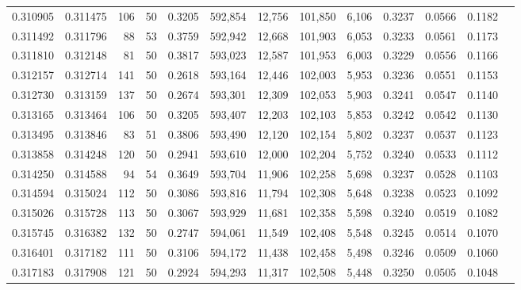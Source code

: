 \begin{tabular}{rrrrrrrrrrrrr}
0.310905 & 0.311475 &   106 &  50 &                                     0.3205 & 592,854 &  12,756 & 101,850 &   6,106 & 0.3237 & 0.0566 & 0.1182 \\
0.311492 & 0.311796 &    88 &  53 &                                     0.3759 & 592,942 &  12,668 & 101,903 &   6,053 & 0.3233 & 0.0561 & 0.1173 \\
0.311810 & 0.312148 &    81 &  50 &                                     0.3817 & 593,023 &  12,587 & 101,953 &   6,003 & 0.3229 & 0.0556 & 0.1166 \\
0.312157 & 0.312714 &   141 &  50 &                                     0.2618 & 593,164 &  12,446 & 102,003 &   5,953 & 0.3236 & 0.0551 & 0.1153 \\
0.312730 & 0.313159 &   137 &  50 &                                     0.2674 & 593,301 &  12,309 & 102,053 &   5,903 & 0.3241 & 0.0547 & 0.1140 \\
0.313165 & 0.313464 &   106 &  50 &                                     0.3205 & 593,407 &  12,203 & 102,103 &   5,853 & 0.3242 & 0.0542 & 0.1130 \\
0.313495 & 0.313846 &    83 &  51 &                                     0.3806 & 593,490 &  12,120 & 102,154 &   5,802 & 0.3237 & 0.0537 & 0.1123 \\
0.313858 & 0.314248 &   120 &  50 &                                     0.2941 & 593,610 &  12,000 & 102,204 &   5,752 & 0.3240 & 0.0533 & 0.1112 \\
0.314250 & 0.314588 &    94 &  54 &                                     0.3649 & 593,704 &  11,906 & 102,258 &   5,698 & 0.3237 & 0.0528 & 0.1103 \\
0.314594 & 0.315024 &   112 &  50 &                                     0.3086 & 593,816 &  11,794 & 102,308 &   5,648 & 0.3238 & 0.0523 & 0.1092 \\
0.315026 & 0.315728 &   113 &  50 &                                     0.3067 & 593,929 &  11,681 & 102,358 &   5,598 & 0.3240 & 0.0519 & 0.1082 \\
0.315745 & 0.316382 &   132 &  50 &                                     0.2747 & 594,061 &  11,549 & 102,408 &   5,548 & 0.3245 & 0.0514 & 0.1070 \\
0.316401 & 0.317182 &   111 &  50 &                                     0.3106 & 594,172 &  11,438 & 102,458 &   5,498 & 0.3246 & 0.0509 & 0.1060 \\
0.317183 & 0.317908 &   121 &  50 &                                     0.2924 & 594,293 &  11,317 & 102,508 &   5,448 & 0.3250 & 0.0505 & 0.1048 \\

\end{tabular}
